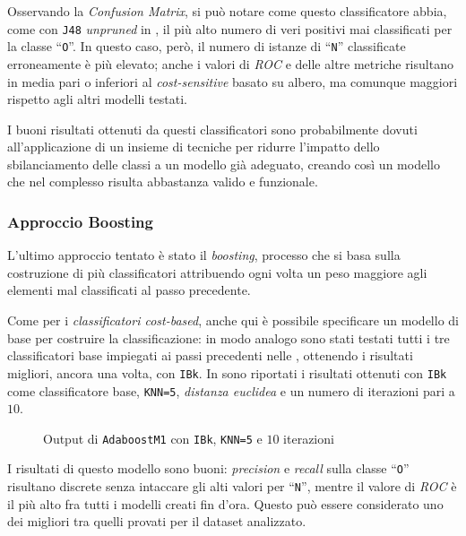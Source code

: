 Osservando la \emph{Confusion Matrix}, si può notare come questo classificatore abbia, come con \texttt{J48} \emph{unpruned} in , il più alto numero di veri positivi mai classificati per la classe ``\texttt{O}''.
In questo caso, però, il numero di istanze di ``\texttt{N}'' classificate erroneamente è più elevato;
anche i valori di \emph{ROC} e delle altre metriche risultano in media pari o inferiori al \emph{cost-sensitive} basato su albero, ma comunque maggiori rispetto agli altri modelli testati.

I buoni risultati ottenuti da questi classificatori sono probabilmente dovuti all'applicazione di un insieme di tecniche per ridurre l'impatto dello sbilanciamento delle classi a un modello già adeguato,
creando così un modello che nel complesso risulta abbastanza valido e funzionale.

\subsubsection{Approccio Boosting}

L'ultimo approccio tentato è stato il \emph{boosting}, processo che si basa sulla costruzione di più classificatori attribuendo ogni volta un peso maggiore agli elementi mal classificati al passo precedente.

Come per i \emph{classificatori cost-based}, anche qui è possibile specificare un modello di base per costruire la classificazione:
in modo analogo sono stati testati tutti i tre classificatori base impiegati ai passi precedenti nelle ,
ottenendo i risultati migliori, ancora una volta, con \texttt{IBk}.
In  sono riportati i risultati ottenuti con \texttt{IBk} come classificatore base, \texttt{KNN=5}, \emph{distanza euclidea} e un numero di iterazioni pari a \(10\).

\begin{figure}[H]
  \centering
  \caption{Output di \texttt{AdaboostM1} con \texttt{IBk}, \texttt{KNN=5} e \(10\) iterazioni}%
  \label{fig:adaboost:ibk5}
\end{figure}

I risultati di questo modello sono buoni: \emph{precision} e \emph{recall} sulla classe ``\texttt{O}'' risultano discrete senza intaccare gli alti valori per ``\texttt{N}'',
mentre il valore di \emph{ROC} è il più alto fra tutti i modelli creati fin d'ora. Questo può essere considerato uno dei migliori tra quelli provati per il dataset analizzato.
